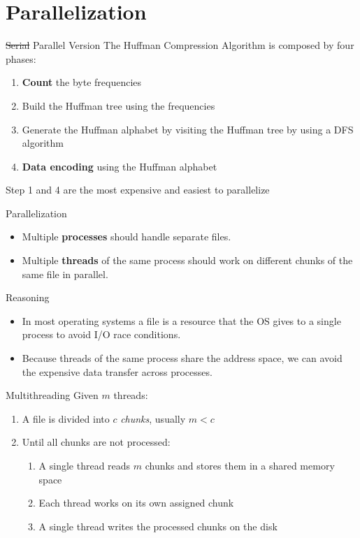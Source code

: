 \section{Parallelization}
\begin{frame}{\st{Serial} Parallel Version}
    The Huffman Compression Algorithm is composed by four phases:
    \begin{enumerate}
        \item \textbf{Count} the byte frequencies
        \item Build the Huffman tree using the frequencies
        \item Generate the Huffman alphabet by visiting the Huffman tree by using a DFS algorithm
        \item \textbf{Data encoding} using the Huffman alphabet
    \end{enumerate}
    Step 1 and 4 are the most expensive and easiest to parallelize
\end{frame}
\begin{frame}{Parallelization}
    \begin{itemize}
        \item Multiple \textbf{processes} should handle separate files.
        \item Multiple \textbf{threads} of the same process should work on different chunks of the same file in parallel.
    \end{itemize}
\end{frame}
\begin{frame}{Reasoning}
    \begin{itemize}
        \item In most operating systems a file is a resource that the OS gives to a single process to avoid I/O race conditions.
        \item Because threads of the same process share the address space, we can avoid the expensive data transfer across processes.
    \end{itemize}
\end{frame}

\begin{frame}{Multithreading}
    Given $m$ threads:

    \begin{enumerate}
        \item A file is divided into $c$ \emph{chunks}, usually $m < c$ 
        \item Until all chunks are not processed:
        \begin{enumerate}
            \item A single thread reads $m$ chunks and stores them in a shared memory space
            \item Each thread works on its own assigned chunk
            \item A single thread writes the processed chunks on the disk
        \end{enumerate}
    \end{enumerate}
\end{frame}


